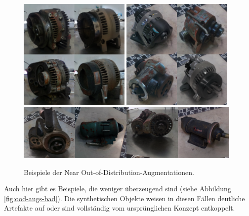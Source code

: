 \begin{figure}
	\centering
	\includegraphics[width=0.48\textwidth]{figure_results_ood-augs_good_1.png}%
	\hspace{0.02\textwidth}\includegraphics[width=0.48\textwidth]{figure_results_ood-augs_good_3.png}\vspace{0.01\textwidth}
	\includegraphics[width=0.98\textwidth]{figure_results_ood-augs_good_4.png}
	\caption{Beispiele der Near Out-of-Distribution-Augmentationen.}
	\label{fig:ood-augs-good}
\end{figure}

Auch hier gibt es Beispiele, die weniger überzeugend sind (siehe Abbildung \ref{fig:ood-augs-bad}). Die synthetischen Objekte weisen in diesen Fällen deutliche Artefakte auf oder sind vollständig vom ursprünglichen Konzept entkoppelt.

